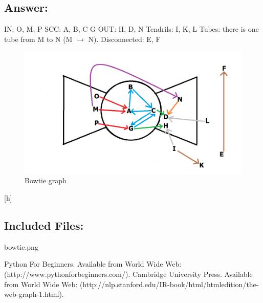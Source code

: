 \documentclass[a4paper, 11pt]{article}
\begin{document}
\subsection*{Answer:}
IN: O, M, P
\noindent
\newline
SCC: A, B, C G
\noindent
\newline
OUT: H, D, N
\noindent
\newline
Tendrils: I, K, L
\noindent
\newline
Tubes: there is one tube from M to N (M $\longrightarrow$ N).
\noindent
\newline
Disconnected: E, F
\begin{figure}[h]
\caption{Bowtie graph}
\centering
\includegraphics[scale=0.5]{bowtie.png}

\end{figure}[h]
\subsection*{Included Files:}
bowtie.png

\begin{thebibliography}{9}
 Python For Beginners. Available from World Wide Web:(http://www.pythonforbeginners.com/).
 Cambridge University Press. Available from World Wide Web: (http://nlp.stanford.edu/IR-book/html/htmledition/the-web-graph-1.html).
\end{thebibliography}
\end{document}
